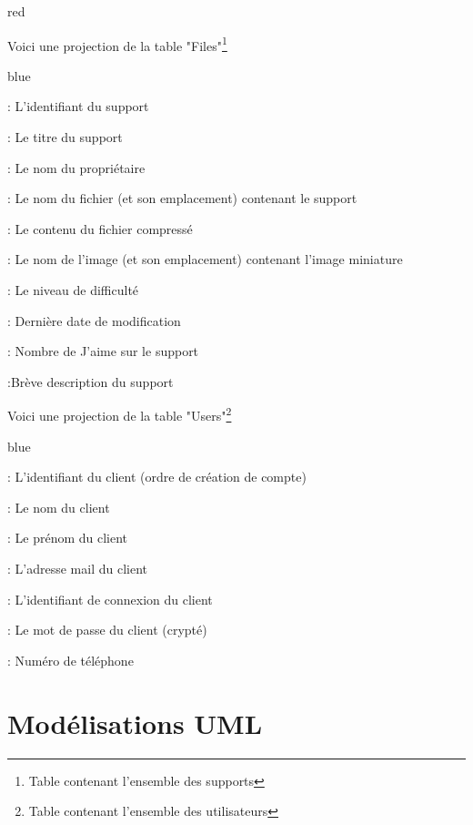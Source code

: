 \begin{items}{red}{\Triangle}

\item Voici une projection de la table "Files"\footnote{Table contenant l'ensemble des supports}

\begin{items}{blue}{\Triangle}
\item {}  : L'identifiant du support
\item {}  : Le titre du support
\item {}  : Le nom du propriétaire
\item {}  : Le nom du fichier (et son emplacement) contenant le support
\item {}  : Le contenu du fichier compressé
\item {}  : Le nom de l'image (et son emplacement) contenant l'image miniature
\item {} : Le niveau de difficulté
\item {} : Dernière date de modification
\item {} : Nombre de J'aime sur le support
\item {}  :Brève description du support
\end{items}
\item Voici une projection de la table "Users"\footnote{Table contenant l'ensemble des utilisateurs}

\begin{items}{blue}{\Triangle}

\item {}  : L'identifiant du client (ordre de création de compte)
\item {}  : Le nom du client
\item {}  : Le prénom du client
\item {}  : L'adresse mail du client
\item {}  : L'identifiant de connexion du client
\item {}  : Le mot de passe du client (crypté)
\item {} : Numéro de téléphone
\end{items}

\end{items}



\newpage

\chapter{Modélisations UML}

